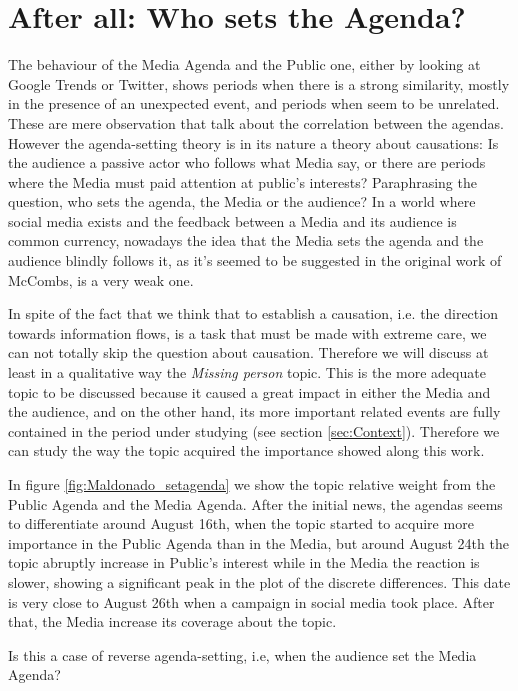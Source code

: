 \section{After all: Who sets the Agenda?}
\label{sec:who_sets}

\par The behaviour of the Media Agenda and the Public one, either by looking at Google Trends or Twitter, shows periods when there is a strong similarity, mostly in the presence of an unexpected event, and periods when seem to be unrelated.
These are mere observation that talk about the correlation between the agendas.
However the agenda-setting theory is in its nature a theory about causations:
Is the audience a passive actor who follows what Media say, or there are periods where the Media must paid attention at public's interests?
Paraphrasing the question, who sets the agenda, the Media or the audience?
In a world where social media exists and the feedback between a Media and its audience is common currency, nowadays the idea that the Media sets the agenda and the audience blindly follows it, as it's seemed to be suggested in the original work of McCombs, is a very weak one. 
\par In spite of the fact that we think that to establish a causation, i.e. the direction towards information flows, is a task that must be made with extreme care, we can not totally skip the question about causation. 
Therefore we will discuss at least in a qualitative way the \emph{Missing person} topic. 
This is the more adequate topic to be discussed because it caused a great impact in either the Media and the audience, and on the other hand, its more important related events are fully contained in the period under studying (see section \ref{sec:Context}).
Therefore we can study the way the topic acquired the importance showed along this work.
\par In figure \ref{fig:Maldonado_setagenda} we show the topic relative weight from the Public Agenda and the Media Agenda. 
After the initial news, the agendas seems to differentiate around August 16th, when the topic started to acquire more importance in the Public Agenda than in the Media, but around August 24th the topic abruptly increase in Public's interest while in the Media the reaction is slower, showing a significant peak in the plot of the discrete differences.
This date is very close to August 26th when a campaign in social media took place. After that, the Media increase its coverage about the topic.
\par Is this a case of reverse agenda-setting, i.e, when the audience set the Media Agenda? 
